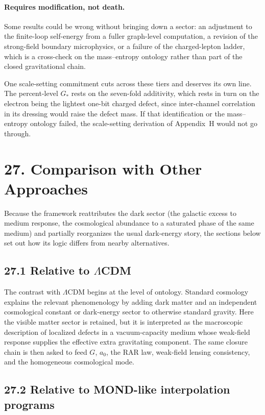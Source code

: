 \documentclass[11pt]{article}
\begin{document}
\paragraph{Requires modification, not death.} Some results could be wrong without bringing down a sector: an adjustment to the finite-loop self-energy from a fuller graph-level computation, a revision of the strong-field boundary microphysics, or a failure of the charged-lepton ladder, which is a cross-check on the mass--entropy ontology rather than part of the closed gravitational chain.

One scale-setting commitment cuts across these tiers and deserves its own line. The percent-level $G_*$ rests on the seven-fold additivity, which rests in turn on the electron being the lightest one-bit charged defect, since inter-channel correlation in its dressing would raise the defect mass. If that identification or the mass--entropy ontology failed, the scale-setting derivation of Appendix~H would not go through.
\section{27. Comparison with Other Approaches}

Because the framework reattributes the dark sector (the galactic excess to medium response, the cosmological abundance to a saturated phase of the same medium) and partially reorganizes the usual dark-energy story, the sections below set out how its logic differs from nearby alternatives.

\subsection{27.1 Relative to \texorpdfstring{$\Lambda$}{Lambda}CDM}

The contrast with $\Lambda$CDM begins at the level of ontology. Standard cosmology explains the relevant phenomenology by adding dark matter and an independent cosmological constant or dark-energy sector to otherwise standard gravity. Here the visible matter sector is retained, but it is interpreted as the macroscopic description of localized defects in a vacuum-capacity medium whose weak-field response supplies the effective extra gravitating component. The same closure chain is then asked to feed $G$, $a_0$, the RAR law, weak-field lensing consistency, and the homogeneous cosmological mode.

\subsection{27.2 Relative to MOND-like interpolation programs}
\end{document}

